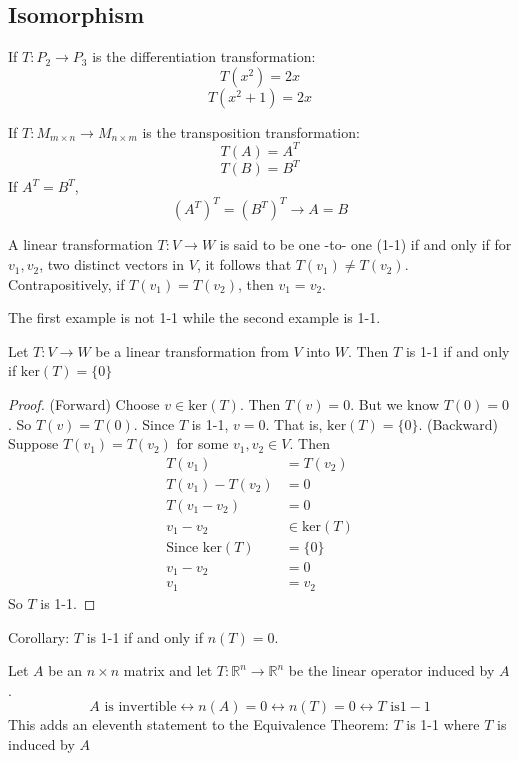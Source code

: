 \documentclass[12pt]{article}
\begin{document}
 \subsection{Isomorphism} 
\begin{example}  If $T: P_2 \to P_3$ is the differentiation transformation: $$T(x^2) = 2x$$ $$T(x^2 + 1) = 2x $$ \end{example}
\begin{example} If $T: M_{m \times n} \to M_{n \times m}$ is the transposition transformation: $$T(A)  = A^T $$ $$T(B) = B^T $$ If $A^T = B^T$, $$(A^T)^T = (B^T)^T \rightarrow A = B $$ \end{example}
 \begin{definition} A linear transformation $T: V \to W$ is said to be one -to- one (1-1) if and only if for $v_1, v_2$, two distinct vectors in $V$, it follows that $T(v_1) \neq T(v_2)$. Contrapositively, if $T(v_1) = T(v_2)$, then $v_1 = v_2$. \end{definition} 
 The first example is not 1-1 while the second example is 1-1. 
 \begin{theorem} Let $T: V \to W$ be a linear transformation from $V$ into $W$. Then $T$ is 1-1 if and only if $\mathrm{ker}(T) = \{0\}$ \end{theorem} 
 \begin{proof} (Forward) Choose $v \in \mathrm{ker}(T)$. Then $T(v) = 0$. But we know $T(0) = 0$. So $T(v) = T(0)$. Since $T$ is 1-1, $v = 0$. That is, $\mathrm{ker}(T) = \{0\}$. \newline (Backward) Suppose $T(v_1) = T(v_2)$ for some $v_1, v_2 \in V$. Then $$\begin{aligned} T(v_1) &= T(v_2) \\ T(v_1) - T(v_2) &= 0 \\ T(v_1 - v_2) &= 0 \\ v_1 - v_2 &\in \mathrm{ker}(T) \\ \text{Since } \mathrm{ker}(T) &= \{0\} \\ v_1 - v_2 &= 0 \\ v_1 &= v_ 2 \end{aligned} $$ So $T$ is 1-1. \end{proof} 
Corollary: $T$ is 1-1 if and only if $n(T) = 0$. 
\begin{theorem} Let $A$ be an $n \times n$ matrix and let $T: \mathbb{R}^n \to \mathbb{R}^n$ be the linear operator induced by $A$. $$A \text{ is invertible} \leftrightarrow n(A) = 0 \leftrightarrow n(T) = 0 \leftrightarrow T \text{ is} 1-1 $$ This adds an eleventh statement to the Equivalence Theorem: $T$ is 1-1 where $T$ is induced by $A$ \end{theorem} 
\end{document}
